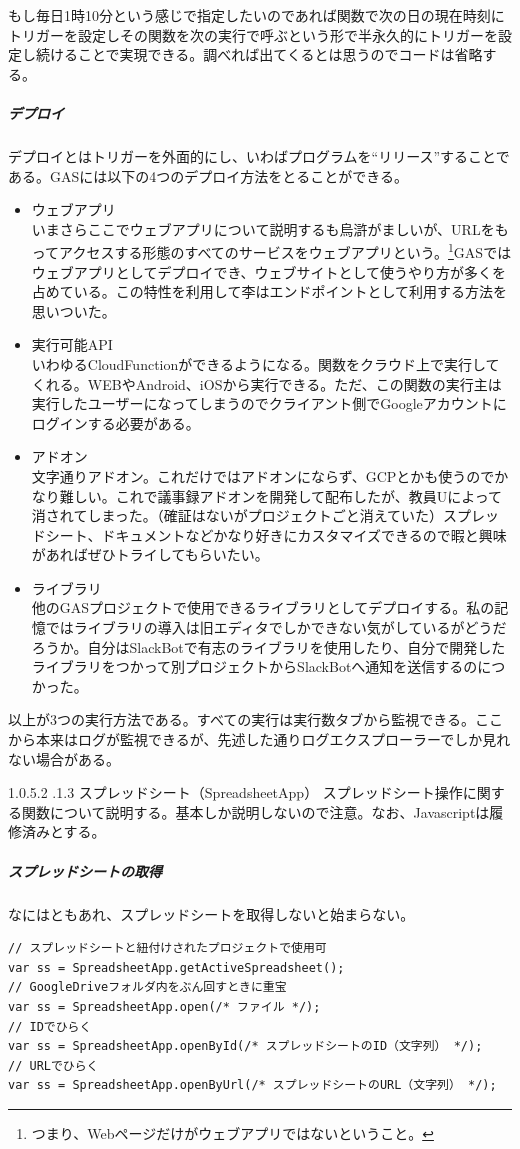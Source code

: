 \documentclass[dvipdfmx,jb5]{jarticle}
\makeatletter
\newcommand{\subsubsubsection}{\@startsection{paragraph}{4}{\z@}%
    {1.0\Cvs \@plus.5\Cdp \@minus.2\Cdp}%
    {.1\Cvs \@plus.3\Cdp}%
    {\large \bfseries}
  }
\makeatother
\begin{document}
もし毎日1時10分という感じで指定したいのであれば関数で次の日の現在時刻にトリガーを設定しその関数を次の実行で呼ぶという形で半永久的にトリガーを設定し続けることで実現できる。調べれば出てくるとは思うのでコードは省略する。

\subparagraph{デプロイ}
デプロイとはトリガーを外面的にし、いわばプログラムを``リリース''することである。GASには以下の4つのデプロイ方法をとることができる。
\begin{itemize}
\item ウェブアプリ\\
いまさらここでウェブアプリについて説明するも烏滸がましいが、URLをもってアクセスする形態のすべてのサービスをウェブアプリという。\footnote{つまり、Webページだけがウェブアプリではないということ。}GASではウェブアプリとしてデプロイでき、ウェブサイトとして使うやり方が多くを占めている。この特性を利用して李はエンドポイントとして利用する方法を思いついた。
\item 実行可能API\\
いわゆるCloudFunctionができるようになる。関数をクラウド上で実行してくれる。WEBやAndroid、iOSから実行できる。ただ、この関数の実行主は実行したユーザーになってしまうのでクライアント側でGoogleアカウントにログインする必要がある。
\item アドオン\\
文字通りアドオン。これだけではアドオンにならず、GCPとかも使うのでかなり難しい。これで議事録アドオンを開発して配布したが、教員Uによって消されてしまった。（確証はないがプロジェクトごと消えていた）スプレッドシート、ドキュメントなどかなり好きにカスタマイズできるので暇と興味があればぜひトライしてもらいたい。
\item ライブラリ\\
他のGASプロジェクトで使用できるライブラリとしてデプロイする。私の記憶ではライブラリの導入は旧エディタでしかできない気がしているがどうだろうか。自分はSlackBotで有志のライブラリを使用したり、自分で開発したライブラリをつかって別プロジェクトからSlackBotへ通知を送信するのにつかった。
\end{itemize}

以上が3つの実行方法である。すべての実行は実行数タブから監視できる。ここから本来はログが監視できるが、先述した通りログエクスプローラーでしか見れない場合がある。

\subsubsubsection{スプレッドシート（SpreadsheetApp）}
スプレッドシート操作に関する関数について説明する。基本しか説明しないので注意。なお、Javascriptは履修済みとする。

\subparagraph{スプレッドシートの取得}
なにはともあれ、スプレッドシートを取得しないと始まらない。
\lstset{language=JavaScript}
\begin{lstlisting}
// スプレッドシートと紐付けされたプロジェクトで使用可
var ss = SpreadsheetApp.getActiveSpreadsheet();
// GoogleDriveフォルダ内をぶん回すときに重宝
var ss = SpreadsheetApp.open(/* ファイル */);
// IDでひらく
var ss = SpreadsheetApp.openById(/* スプレッドシートのID（文字列） */);
// URLでひらく
var ss = SpreadsheetApp.openByUrl(/* スプレッドシートのURL（文字列） */);
\end{lstlisting}
\end{document}
